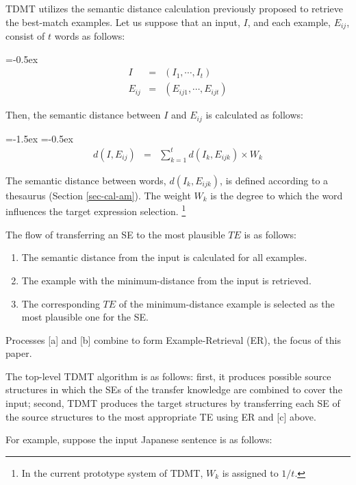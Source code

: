  TDMT utilizes the semantic distance calculation previously proposed  
\cite{Sumita92b} to retrieve the best-match examples.
 Let us suppose that an input, $I$, and each example, $E_{ij}$,
consist of $t$ words as follows: 

{
\abovedisplayskip=-0.5ex
\begin{eqnarray*}
 I &=& (I_{1}, \cdots , I_{t}) \\
 E_{ij} &=& (E_{ij1}, \cdots ,E_{ijt})
\end{eqnarray*}
}

 Then, the semantic distance between $I$ and $E_{ij}$ is calculated as 
follows:

{
\abovedisplayskip=-1.5ex
\belowdisplayskip=-0.5ex
\begin{eqnarray}
d (I, E_{ij}) & = & \sum^t_{k=1} d (I_{k}, E_{ijk})\times W_{k}
\end{eqnarray}
}

 The semantic distance between words, $d (I_{k}, E_{ijk})$, is 
defined according to 
a thesaurus (Section \ref{sec-cal-am}).
The weight $W_k$ is the degree to which the word influences the
target expression selection. \footnote{In the current prototype system of TDMT,
$W_k$ is assigned to  $1/t$.}

 The flow of transferring an SE to the most plausible $TE$ is as follows:

\begin{enumerate}
  \renewcommand{\labelenumi}{}
  \topsep = 0pt
  \partopsep = 0pt
  \parskip = 0pt
  \itemsep = 0pt
  \item The semantic distance from the input is calculated for all examples.
  \item The example with the minimum-distance from the input is retrieved.
  \item The corresponding $TE$ of the minimum-distance example is selected 
        as the most plausible one for the SE.
\end{enumerate}

Processes [a] and [b] combine to form
Example-Retrieval (ER), the focus of this paper.

The top-level TDMT algorithm is as follows:
first, it  produces possible source structures in which the SEs of the transfer
knowledge are combined to cover the input;
second, TDMT produces the target structures by 
transferring each SE of the source structures to the most 
appropriate TE using ER and [c] above.
 
For example, suppose the input Japanese sentence is as follows:

